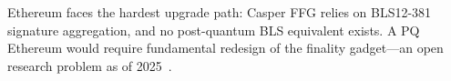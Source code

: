 Ethereum faces the hardest upgrade path: Casper FFG relies on BLS12-381 signature
aggregation, and no post-quantum BLS equivalent exists. A PQ Ethereum would require
fundamental redesign of the finality gadget---an open research problem as of
2025~\cite{ethereum-pq}.

